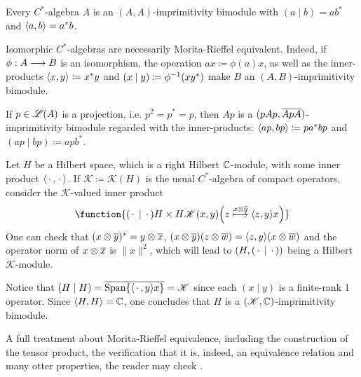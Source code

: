 \begin{exemplos}$\left.\right.$
	\begin{itroman}
		\item Every $C^*$-algebra $A$ is an $(A,A)$-imprimitivity bimodule with $(a\mid b) = ab^*$ and $\langle {a},{b}\rangle = a^*b$. 

		\item Isomorphic $C^*$-algebras are necessarily Morita-Rieffel equivalent. Indeed, if $\phi : A \longrightarrow B$ is an isomorphism, the operation $ax \coloneqq \phi(a) x$, as well as the inner-products $\langle {x},{y}\rangle \coloneqq x^*y$ and $(x\mid y)\coloneqq {\phi}^{-1}(xy^*)$ make $B$ an $(A,B)$-imprimitivity bimodule.

		\item If $p \in \mathscr L(A)$ is a projection, i.e. $p^2=p^* = p$, then $Ap$ is a $(pAp, \overline{ApA})$-imprimitivity bimodule regarded with the inner-products: $\langle {ap},{bp}\rangle \coloneqq pa^*bp$ and $(ap\mid bp) \coloneqq apb^*$.

		\item Let $H$ be a Hilbert space, which is a right Hilbert $\operatorname{\mathbb{C}}$-module, with some inner product $\langle {\operatorname{\,\cdot\,}},{\operatorname{\,\cdot\,}}\rangle$. If $\mathscr K \coloneqq \mathscr K(H)$ is the usual $C^*$-algebra of compact operators, consider the $\mathscr K$-valued inner product 
	\begin{equation*}
		\function{{(\come\mid \come)}{H\times H}{\mathscr K}{(x,y)}{\left(z \overset{x\otimes \con y}\longmapsto \inner{z}{y}x \right)}}
	\end{equation*}
	One can check that $(x\otimes \overline{y})^* = y \otimes \overline{x}$, $(x \otimes \overline{y})(z \otimes \overline{w}) = \langle {z},{y}\rangle(x\otimes \overline{w})$ and the operator norm of $x\otimes \overline{x}$ is $\|x\|^2$, which will lead to $\left(H, (\operatorname{\,\cdot\,}\mid \operatorname{\,\cdot\,})\right)$ being a Hilbert $\mathscr K$-module.

	Notice that $(H\mid H) = \overline{\operatorname{Span} \{\langle {\operatorname{\,\cdot\,}},{y}\rangle x\}} = \mathscr K$ since each $(x\mid y)$ is a finite-rank 1 operator. Since $\langle {H},{H}\rangle = \operatorname{\mathbb{C}}$, one concludes that $H$ is a $(\mathscr K, \operatorname{\mathbb{C}})$-imprimitivity bimodule.

	\end{itroman}
\end{exemplos}

A full treatment about Morita-Rieffel equivalence, including the construction of the tensor product, the verification that it is, indeed, an equivalence relation and many otter properties, the reader may check \cite{raeburn1998morita}.


